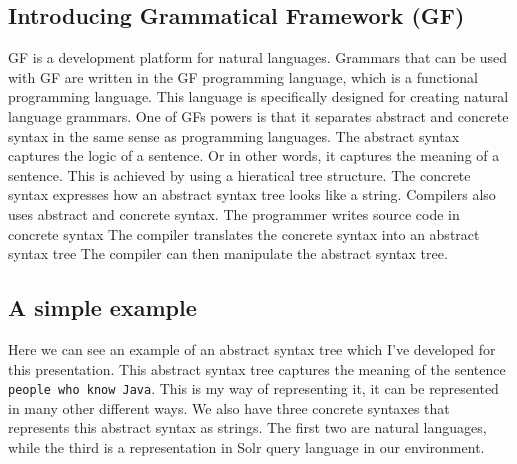 \documentclass[
10pt, %
a4paper, %
oneside, %
headinclude,footinclude, %
BCOR5mm, %
]{scrartcl}
\begin{document}
\subsection{Introducing Grammatical Framework (GF)}
GF is a development platform for natural languages.
\newline
\newline
Grammars that can be used with GF are written in the GF programming language, which is a functional programming language.
\newline
\newline
This language is specifically designed for creating natural language grammars.
\newline
\newline
One of GFs powers is that it separates abstract and concrete syntax in the same sense as programming languages.
\newline
\newline
The abstract syntax captures the logic of a sentence. Or in other words, it captures the meaning of a sentence. This is achieved by using a hieratical tree structure.
\newline
\newline
The concrete syntax expresses how an abstract syntax tree looks like a string.
\newline
\newline
Compilers also uses abstract and concrete syntax.
\newline
\newline
The programmer writes source code in concrete syntax
\newline
\newline
The compiler translates the concrete syntax into an abstract syntax tree
\newline
\newline
The compiler can then manipulate the abstract syntax tree.

\subsection{A simple example}
Here we can see an example of an abstract syntax tree which I've developed for this presentation. This abstract syntax tree captures the meaning of the sentence \texttt{people who know Java}. This is my way of representing it, it can be represented in many other different ways.
\newline
\newline
We also have three concrete syntaxes that represents this abstract syntax as strings. The first two are natural languages, while the third is a representation in Solr query language in our environment.
\end{document}
